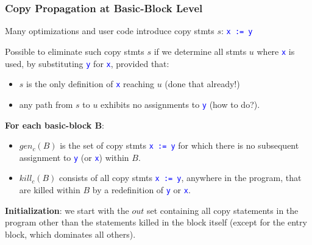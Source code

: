 \documentclass{beamer}
\newcommand{\blue}[1]{\textcolor{Blue}{{#1}}}
\renewcommand{\emph}[1]{\textcolor{structure}{#1}}
\newcommand{\emp}[1]{\textcolor{DikuRed}{ #1}}
\begin{document}
\begin{frame}[fragile,t]
    \frametitle{Copy Propagation at Basic-Block Level}

\emp{Many optimizations and user code introduce copy stmts $s$}: \blue{\tt x := y}

\bigskip

Possible to eliminate such copy stmts \emp{$s$} if we determine all stmts \emp{$u$}
where \blue{\tt x} is used, by substituting \blue{\tt y} for \blue{\tt x}, provided that:\smallskip
\begin{itemize}
    \item \emp{$s$} is the only definition of \blue{\tt x} reaching \emp{$u$} (\emph{done that already!})\smallskip
    \item any path from \emp{$s$} to \emp{$u$} exhibits no assignments to \blue{\tt y} (\alert{how to do?}).
\end{itemize}

\pause
\bigskip


\emph{\bf For each basic-block B}:
\begin{itemize}
    \item $gen_c(B)$ is the set of copy stmts \blue{\tt x := y} for which there is no
            subsequent assignment to \blue{\tt y} (or \blue{\tt x}) within $B$.\smallskip
    \item $kill_c(B)$ consists of all copy stmts \blue{\tt x := y}, anywhere in the
            program, that are killed within $B$ by a redefinition of \blue{\tt y} or \blue{\tt x}.
\end{itemize}

\pause
\bigskip

\emph{\bf Initialization}: we start with the $out$ set containing all copy
statements in the program other than the statements killed in the
block itself (except for the entry block, which dominates all others).

\end{frame}
\end{document}
